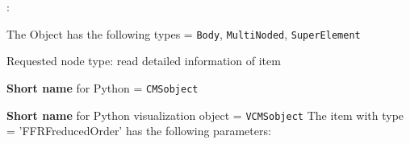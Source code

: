 \noindent {}:
\bi
  \item The Object has the following types = \texttt{Body}, \texttt{MultiNoded}, \texttt{SuperElement}
  \item Requested node type: read detailed information of item
  \item {\bf Short name} for Python = \texttt{CMSobject}
  \item {\bf Short name} for Python visualization object = \texttt{VCMSobject}
\ei\vspace{12pt} \noindent 
The item  with type = 'FFRFreducedOrder' has the following parameters:
\vspace{-0.5cm}\\
\vspace{-0.5cm}\\

